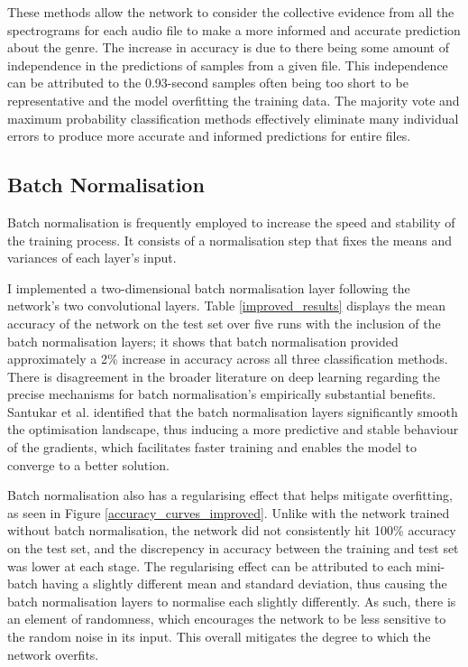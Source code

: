 \documentclass[conference]{IEEEtran}
\begin{document}
These methods allow the network to consider the collective evidence from all the spectrograms for each audio file to make a more informed and accurate prediction about the genre.
The increase in accuracy is due to there being some amount of independence in the predictions of samples from a given file.
This independence can be attributed to the 0.93-second samples often being too short to be representative and the model overfitting the training data.
The majority vote and maximum probability classification methods effectively eliminate many individual errors to produce more accurate and informed predictions for entire files.

\subsection{Batch Normalisation}

Batch normalisation \cite{IoffeSzegedy} is frequently employed to increase the speed and stability of the training process.
It consists of a normalisation step that fixes the means and variances of each layer's input.

I implemented a two-dimensional batch normalisation layer following the network's two convolutional layers.
Table \ref{improved_results} displays the mean accuracy of the network on the test set over five runs with the inclusion of the batch normalisation layers; it shows that batch normalisation provided approximately a 2\% increase in accuracy across all three classification methods.
There is disagreement in the broader literature on deep learning regarding the precise mechanisms for batch normalisation's empirically substantial benefits.
Santukar et al. \cite{SanturkarEtAl} identified that the batch normalisation layers significantly smooth the optimisation landscape, thus inducing a more predictive and stable behaviour of the gradients, which facilitates faster training and enables the model to converge to a better solution.

Batch normalisation also has a regularising effect that helps mitigate overfitting, as seen in Figure \ref{accuracy_curves_improved}.
Unlike with the network trained without batch normalisation, the network did not consistently hit 100\% accuracy on the test set, and the discrepency in accuracy between the training and test set was lower at each stage.
The regularising effect can be attributed to each mini-batch having a slightly different mean and standard deviation, thus causing the batch normalisation layers to normalise each slightly differently.
As such, there is an element of randomness, which encourages the network to be less sensitive to the random noise in its input.
This overall mitigates the degree to which the network overfits.
\end{document}
